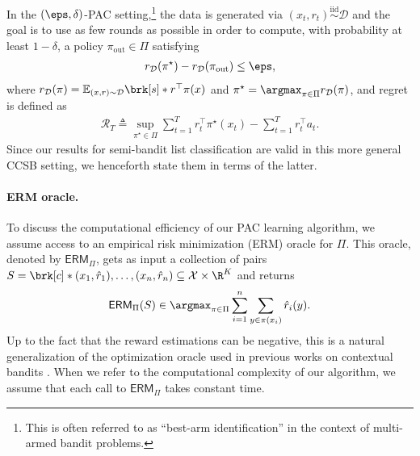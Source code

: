 \documentclass[11pt]{article}
\newcommand{\eqdef}{\triangleq}
\newcommand{\bbE}{\boldsymbol{\mathbb{E}}}
\renewcommand{\E}{\bbE}
\newcommand{\liad}[1]{\textcolor{blue}{\bf \{LE: #1\}}}
\newcommand{\oracle}{\textsf{ERM}}
\newcommand{\pred}{a}
\newcommand{\rew}{r}
\newcommand{\lab}{y}
\newcommand{\piout}{\pi_{\mathrm{out}}}
\newcommand{\calX}{\mathcal{X}}
\newcommand{\calD}{\mathcal{D}}
\newcommand{\calS}{\mathcal{S}}
\newcommand{\regret}{\mathcal{R}}
\theoremstyle{plain}
\begin{document}
In the $(\eps,\delta)$-PAC setting,\footnote{This is often referred to as ``best-arm identification'' in the context of multi-armed bandit problems.} the data is generated via $(x_t,r_t) \overset{\mathrm{iid}}{\sim} \calD$ and the goal is to use as few rounds as possible in order to compute, with probability at least $1-\delta$, a policy $\piout \in \Pi$ satisfying
\begin{align*}
    \rew_\calD(\pi^\star) - \rew_\calD(\piout) \leq \eps,
\end{align*}
where $\rew_\calD(\pi) = \E_{(x,\rew) \sim \calD} \brk[s]*{\rew^\top \pi(x)}$ and $\pi^\star = \argmax_{\pi \in \Pi} \rew_\calD(\pi)$, 
and regret is defined as
\begin{align*}
    \regret_T \eqdef \sup_{\pi^\star \in \Pi} \sum_{t=1}^T \rew_t^\top \pi^\star(x_t) - \sum_{t=1}^T \rew_t^\top \pred_t.
\end{align*}
% 
Since our results for semi-bandit list classification are valid in this more general CCSB setting, we henceforth state them in terms of the latter.


\paragraph{ERM oracle.} To discuss the computational efficiency of our PAC learning algorithm, we assume access to an empirical risk minimization (ERM) oracle for $\Pi$. This oracle, denoted by $\oracle_\Pi$, gets as input a collection of pairs $S = \brk[c]*{(x_1,\hat \rew_1),\ldots,(x_n,\hat \rew_n)} \subseteq \calX \times \R^K$ and returns
\begin{align*}
    \oracle_\Pi(S) \in \argmax_{\pi \in \Pi} \sum_{i=1}^n \sum_{\lab \in \pi(x_i)} \hat \rew_i(\lab).
\end{align*}
Up to the fact that the reward estimations can be negative, this is a natural generalization of the optimization oracle used in previous works on contextual bandits \citep{dudik2011efficient,agarwal2014taming}. When we refer to the computational complexity of our algorithm, we assume that each call to $\oracle_\Pi$ takes constant time.
\end{document}
